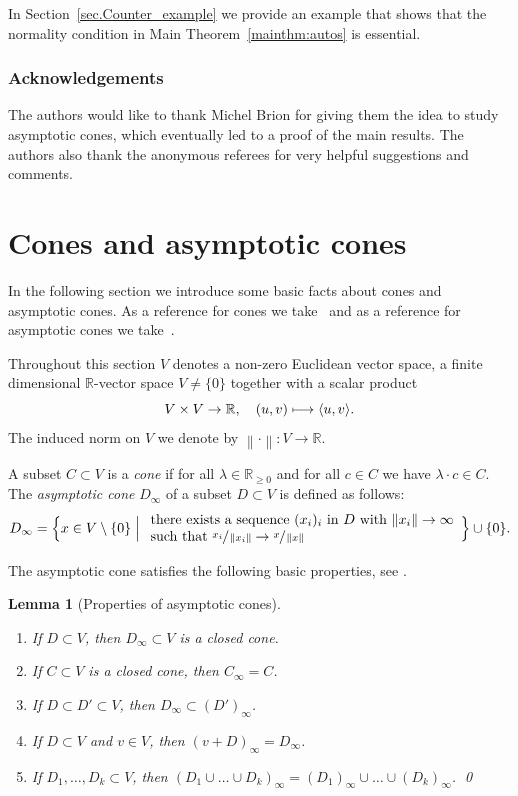 \documentclass[JEP,XML,SOM,Unicode]{cedram}
\def\mto{\mathchoice{\longmapsto}{\mapsto}{\mapsto}{\mapsto}}
\theoremstyle{plain}
\newtheorem{lemma}[theorem]{Lemma}
\theoremstyle{definition}
\newcommand{\norm}[1]{\left\lVert#1\right\rVert}
\newcommand{\RR}{\mathbb{R}}
\newcommand{\name}[1]{#1}
\begin{document}
In Section~\ref{sec.Counter_example} we provide an example that shows that the normality
condition in Main Theorem~\ref{mainthm:autos} is essential.

\subsubsection*{Acknowledgements}
The authors would like to thank \name{Michel Brion} for giving them the idea to
study asymptotic cones, which eventually led to a proof of the main results.
The authors also thank the anonymous referees for very helpful suggestions and comments.

\section{Cones and asymptotic cones}
\label{sec.Cones_and_asymptotic_cones}
In the following section we introduce some basic facts about cones and asymptotic cones.
As a reference for cones we take~\cite[\S1.2]{Fu1993Introduction-to-to} and as a
reference for asymptotic cones we take~\cite[Chap.\,2]{AuTe2003Asymptotic-cones-a}.

Throughout this section $V$ denotes a non-zero Euclidean vector space, \ie a finite dimensional $\RR$-vector space $V \neq \{0\}$
together with a scalar product
\[
V \times V \to \RR, \quad (u, v) \mto \langle u, v \rangle.
\]
The induced norm on $V$ we denote by $\norm{\cdot} \colon V \to \RR$.

A subset $C \subset V$ is a \emph{cone} if
for all $\lambda \in \RR_{\geq 0}$ and for all $c \in C$ we have
$\lambda \cdot c \in C$.
The \emph{asymptotic cone} $D_{\infty}$
of a subset $D \subset V$ is defined as follows:
\[
D_{\infty} = \Bigl\{x \in V \setminus \{0\} \Bigm|
\begin{array}{l}
\textrm{there exists a sequence $(x_i)_i$ in $D$ with $\norm{x_i} \to \infty$} \\
\textrm{such that $\sfrac{x_i}{\norm{x_i}} \to \sfrac{x}{\norm{x}}$}
\end{array}
\Bigr\} \cup \{0\}.
\]

The asymptotic cone satisfies the following basic properties, see
\eg \cite[Prop.\,2.1.1, Prop.\,2.1.9]{AuTe2003Asymptotic-cones-a}.

\skpt
\begin{lemma}[Properties of asymptotic cones]
\label{lem.Properties_asymptotic_cone}
\begin{enumerate}
\item If $D \subset V$, then $D_{\infty} \subset V$
is a closed cone.
\item If $C \subset V$ is a closed cone, then $C_{\infty} = C$.
\item If $D \subset D' \subset V$, then $D_\infty \subset (D')_{\infty}$.
\item If $D \subset V$ and $v \in V$, then
$(v+D)_{\infty} = D_{\infty}$.
\item If $D_1, \ldots, D_k \subset V$, then
$(D_1 \cup \ldots \cup D_k)_{\infty} =
(D_1)_{\infty} \cup \ldots \cup (D_k)_{\infty}$. \qed
\end{enumerate}
\end{lemma}
\end{document}
